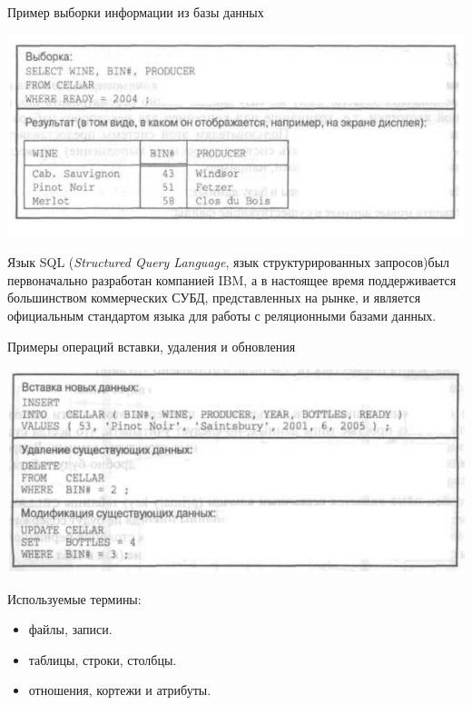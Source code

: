 \documentclass{beamer}
\begin{document}
\begin{frame}
\begin{block}{Пример выборки информации из базы данных}
\begin{center}
\includegraphics[scale=0.5]{images/example-02.png}
\end{center}
\end{block}
Язык SQL (\textit{Structured Query Language}, язык структурированных запросов)был первоначально разработан компанией IBM, а в настоящее время поддерживается большинством коммерческих СУБД, представленных на рынке, и является официальным стандартом языка для работы с реляционными базами данных.
\end{frame} 

\begin{frame}
\begin{block}{Примеры операций вставки, удаления и обновления}
\begin{center}
\includegraphics[scale=0.5]{images/example-03.png}
\end{center}
\end{block}
Используемые термины:
\begin{itemize}
\item файлы, записи.
\item таблицы, строки, столбцы.
\item отношения, кортежи и атрибуты.
\end{itemize}
\end{frame}
\end{document}
